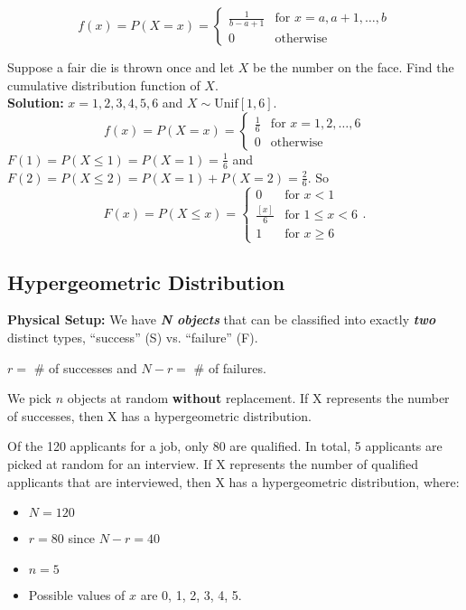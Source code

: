 \[
    f(x) = P(X = x) = 
    \begin{cases} 
        \frac{1}{b - a + 1} & \text{for } x = a, a + 1, \ldots, b \\
        0 & \text{otherwise}
    \end{cases}
\]

\begin{example}
    Suppose a fair die is thrown once and let $X$ be the number on the face. Find the cumulative distribution function of $X$. \\
    \textbf{Solution:} $x = 1,2,3,4,5,6$ and $X \sim \text{Unif}[1,6]$.
    \[
        f(x) = P(X = x) = 
        \begin{cases} 
            \frac{1}{6} & \text{for } x = 1,2,\ldots,6 \\
            0 & \text{otherwise}
        \end{cases}
    \]
    $F(1) = P(X \leq 1) = P(X = 1) = \frac{1}{6}$ and $F(2) = P(X \leq 2) = P(X = 1) + P(X = 2) = \frac{2}{6}$. So
    \[
        F(x) = P(X \leq x) = 
        \begin{cases} 
            0 & \text{for } x < 1 \\
            \frac{[x]}{6} & \text{for } 1 \leq x < 6 \\
            1 & \text{for } x \geq 6 
        \end{cases}.
    \]
\end{example}


\subsection{Hypergeometric Distribution}

\textbf{Physical Setup:}
We have \textbf{\textit{N objects}} that can be classified into exactly \textbf{\textit{two}} distinct types, “success” (S) vs. “failure” (F).

$r =$ \# of successes \quad and \quad $N-r=$ \# of failures.

We pick \underline{$n$} objects at random \textbf{without} replacement. If X represents the number of successes, then X has a hypergeometric distribution.

\begin{example}
    Of the 120 applicants for a job, only 80 are qualified. In total, 5 applicants are picked at random for an interview. If X represents the number of qualified
    applicants that are interviewed, then X has a hypergeometric distribution, where:
    \begin{itemize}
        \item $N = 120$
        \item $r = 80$ since $N - r = 40$
        \item $n = 5$
        \item Possible values of $x$ are 0, 1, 2, 3, 4, 5.
    \end{itemize}
\end{example}

